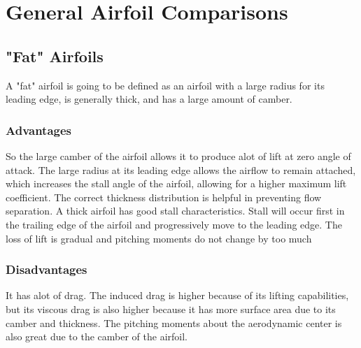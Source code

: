 \section{General Airfoil Comparisons}
\begin{comment}
\end{comment}

\subsection{"Fat" Airfoils}
\begin{comment}
\end{comment}
A "fat" airfoil is going to be defined as an airfoil with a large radius for its leading edge, is generally thick, and has a large amount of camber.

\subsubsection{Advantages}
\begin{comment}
\end{comment}

So the large camber of the airfoil allows it to produce alot of lift at zero angle of attack.
The large radius at its leading edge allows the airflow to remain attached, which increases the stall angle of the airfoil, allowing for a higher maximum lift coefficient.
The correct thickness distribution is helpful in preventing flow separation.
A thick airfoil has good stall characteristics. Stall will occur first in the trailing edge of the airfoil and progressively move to the leading edge. The loss of lift is gradual and pitching moments do not change by too much

\subsubsection{Disadvantages}
\begin{comment}
\end{comment}
It has alot of drag. The induced drag is higher because of its lifting capabilities, but its viscous drag is also higher because it has more surface area due to its camber and thickness. The pitching moments about the aerodynamic center is also great due to the camber of the airfoil.

